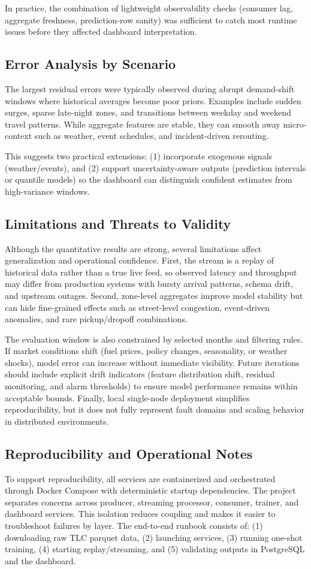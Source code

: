 \documentclass[conference]{IEEEtran}
\begin{document}
In practice, the combination of lightweight observability checks (consumer lag, aggregate freshness, prediction-row sanity) was sufficient to catch most runtime issues before they affected dashboard interpretation.

\subsection{Error Analysis by Scenario}
The largest residual errors were typically observed during abrupt demand-shift windows where historical averages become poor priors. Examples include sudden surges, sparse late-night zones, and transitions between weekday and weekend travel patterns. While aggregate features are stable, they can smooth away micro-context such as weather, event schedules, and incident-driven rerouting.

This suggests two practical extensions: (1) incorporate exogenous signals (weather/events), and (2) support uncertainty-aware outputs (prediction intervals or quantile models) so the dashboard can distinguish confident estimates from high-variance windows.

\subsection{Limitations and Threats to Validity}
Although the quantitative results are strong, several limitations affect generalization and operational confidence. First, the stream is a replay of historical data rather than a true live feed, so observed latency and throughput may differ from production systems with bursty arrival patterns, schema drift, and upstream outages. Second, zone-level aggregates improve model stability but can hide fine-grained effects such as street-level congestion, event-driven anomalies, and rare pickup/dropoff combinations.

The evaluation window is also constrained by selected months and filtering rules. If market conditions shift (fuel prices, policy changes, seasonality, or weather shocks), model error can increase without immediate visibility. Future iterations should include explicit drift indicators (feature distribution shift, residual monitoring, and alarm thresholds) to ensure model performance remains within acceptable bounds. Finally, local single-node deployment simplifies reproducibility, but it does not fully represent fault domains and scaling behavior in distributed environments.

\subsection{Reproducibility and Operational Notes}
To support reproducibility, all services are containerized and orchestrated through Docker Compose with deterministic startup dependencies. The project separates concerns across producer, streaming processor, consumer, trainer, and dashboard services. This isolation reduces coupling and makes it easier to troubleshoot failures by layer. The end-to-end runbook consists of: (1) downloading raw TLC parquet data, (2) launching services, (3) running one-shot training, (4) starting replay/streaming, and (5) validating outputs in PostgreSQL and the dashboard.
\end{document}
